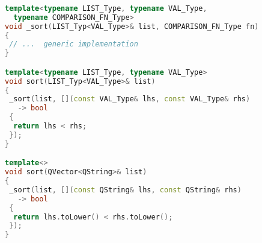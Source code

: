 \begin{lstlisting}[caption={%
\emblink{\#lst--sorts--\thelstlisting.pgvm-pdf}{Templates and Explicit Specialization}},
  language = C++, numbers = none, escapechar = !,label={lst:sorts},
    basicstyle = \ttfamily\bfseries\footnotesize, linewidth = \linewidth]
	
template<typename LIST_Type, typename VAL_Type, 
  typename COMPARISON_FN_Type>
void _sort(LIST_Typ<VAL_Type>& list, COMPARISON_FN_Type fn)
{
 // ...  generic implementation
}

template<typename LIST_Type, typename VAL_Type>
void sort(LIST_Typ<VAL_Type>& list)
{
 _sort(list, [](const VAL_Type& lhs, const VAL_Type& rhs)
   -> bool
 {
  return lhs < rhs;
 });
}

template<>
void sort(QVector<QString>& list)
{
 _sort(list, [](const QString& lhs, const QString& rhs)
   -> bool
 {
  return lhs.toLower() < rhs.toLower();
 });
}
 
\end{lstlisting}

